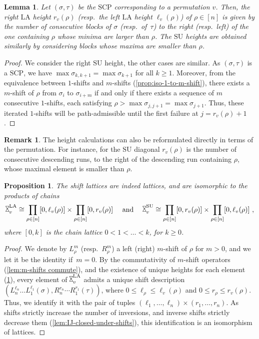 \documentclass{amsart}
\newtheorem{proposition}[theorem]{Proposition}
\newtheorem{lemma}[theorem]{Lemma}
\theoremstyle{definition}
\newtheorem{remark}[theorem]{Remark}
\newcommand{\resp}{resp.~} %
\newcommand{\SU}{\mathrm{SU}}
\newcommand{\LA}{\mathrm{LA}}
\newcommand{\SCP}{\mathrm{SCP}}
\newcommand{\hour}{\raisebox{0.065cm}{\rotatebox[origin=c]{90}{$\bowtie$}}_v}
\begin{document}
\begin{lemma}
\label{prop:maximal m-shift formulae}
Let $(\sigma,\tau)$ be the $\SCP$ corresponding to a permutation $v$.
Then, the right $\LA$ height $r_v(\rho)$ (\resp the left $\LA$ height $\ell_v(\rho)$) of $\rho \in [n]$ is given by the number of consecutive blocks of $\sigma$ (\resp of~$\tau$) to the right (\resp left) of the one containing $\rho$ whose minima are larger than $\rho$.
The $\SU$ heights are obtained similarly by considering blocks whose maxima are smaller than $\rho$. 
\end{lemma}

\begin{proof}
We consider the right $\SU$ height, the other cases are similar. 
As $(\sigma,\tau)$ is a $\SCP$, we have $\max \sigma_{k,k+1} = \max \sigma_{k+1}$ for all $k\geq 1$. 
Moreover, from the equivalence between $1$-shifts and $m$-shifts (\cref{prop:iso-1-to-m-shift}), there exists a $m$-shift of $\rho$ from $\sigma_i$ to $\sigma_{i+m}$ if and only if there exists a sequence of $m$ consecutive $1$-shifts, each satisfying $\rho > \max \sigma_{j,j+1}=\max \sigma_{j+1}$.
Thus, these iterated $1$-shifts will be path-admissible until the first failure at $j=r_v(\rho)+1$.
\end{proof}

\begin{remark}
The height calculations can also be reformulated directly in terms of the permutation.
For instance, for the $\SU$ diagonal $r_v(\rho)$ is the number of consecutive descending runs, to the right of the descending run containing $\rho$, whose maximal element is smaller than $\rho$.
\end{remark}

\begin{proposition} 
\label{prop:shift lattice}
The shift lattices are indeed lattices, and are isomorphic to the products of chains
\begin{align*}
\hour^\LA \cong \prod_{\rho \in [n]} [0,\ell_v(\rho)] \times \prod_{\rho \in [n]} [0,r_v(\rho)]
\quad \text{ and } \quad
\hour^\SU \cong \prod_{\rho \in [n]} [0,r_v(\rho)] \times \prod_{\rho \in [n]} [0,\ell_v(\rho)] \ ,
\end{align*}
where $[0,k]$ is the chain lattice $0<1<\dots<k$, for $k\geq 0$.
\end{proposition}

\begin{proof}
We denote by $L_\rho^m$ (\resp $R_\rho^m$) a left (right) $m$-shift of $\rho$ for $m>0$, and we let it be the identity if~$m=0$.
By the commutativity of $m$-shift operators (\cref{lem:m-shifts commute}), and the existence of unique heights for each element (\cref{prop:maximal m-shift formulae}), every element of $\hour^\LA$ admits a unique shift description $(L^{\ell_n}_{n} \dots L^{\ell_1}_{1}(\sigma),
R^{r_n}_{n}\cdots R^{r_{1}}_{1}(\tau))$, where $0\leq \ell_\rho\leq \ell_v(\rho)$ and $0\leq r_\rho\leq r_v(\rho)$.
Thus, we identify it with the pair of tuples $(\ell_1,\ldots,\ell_n)\times (r_1,\ldots,r_n)$.
As shifts strictly increase the number of inversions, and inverse shifts strictly decrease them (\cref{lem:IJ-closed-under-shifts}), this identification is an isomorphism of lattices.
\end{proof}
\end{document}
